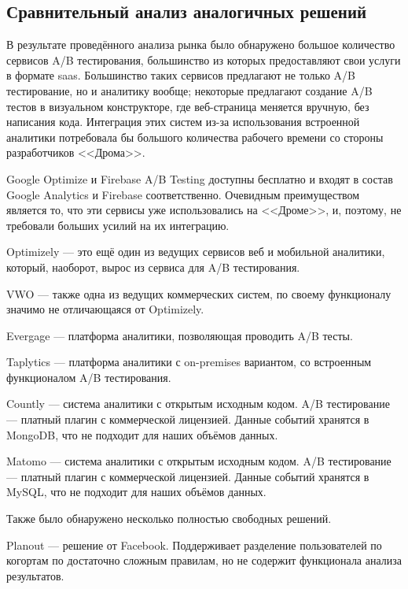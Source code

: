 \documentclass[../document.tex]{subfiles}
\begin{document}
	\subsection{Сравнительный анализ аналогичных решений}
	\par В результате проведённого анализа рынка было обнаружено большое количество сервисов A/B тестирования, большинство из которых предоставляют свои услуги в формате \gls{saas}. Большинство таких сервисов предлагают не только A/B тестирование, но и аналитику вообще; некоторые предлагают создание A/B тестов в визуальном конструкторе, где веб-страница меняется вручную, без написания кода. Интеграция этих систем из-за использования встроенной аналитики потребовала бы большого количества рабочего времени со стороны разработчиков <<Дрома>>.
	\par Google Optimize и Firebase A/B Testing \cite{optimize, firebase} доступны бесплатно и входят в состав Google Analytics и Firebase соответственно. Очевидным преимуществом является то, что эти сервисы уже использовались на <<Дроме>>, и, поэтому, не требовали больших усилий на их интеграцию.
	\par Optimizely \cite{optimizely} --- это ещё один из ведущих сервисов веб и мобильной аналитики, который, наоборот, вырос из сервиса для A/B тестирования.
	\par VWO \cite{vwo} --- также одна из ведущих коммерческих систем, по своему функционалу значимо не отличающаяся от Optimizely.
	\par Evergage \cite{evergage} --- платформа аналитики, позволяющая проводить A/B тесты.
	\par Taplytics \cite{taplytics} --- платформа аналитики с on-premises вариантом, со встроенным функционалом A/B тестирования.
	\par Countly \cite{countly} --- система аналитики с открытым исходным кодом. A/B тестирование --- платный плагин с коммерческой лицензией. Данные событий хранятся в MongoDB, что не подходит для наших объёмов данных.
	\par Matomo \cite{matomo} --- система аналитики с открытым исходным кодом. A/B тестирование --- платный плагин с коммерческой лицензией. Данные событий хранятся в MySQL, что не подходит для наших объёмов данных.
	\par Также было обнаружено несколько полностью свободных решений.
	\par Planout \cite{planout} --- решение от Facebook. Поддерживает разделение пользователей по когортам по достаточно сложным правилам, но не содержит функционала анализа результатов.
\end{document}
